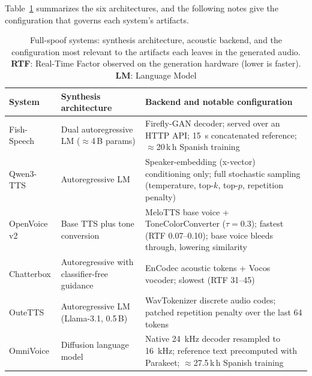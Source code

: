 \documentclass[11pt]{article}
\begin{document}
Table~\ref{tab:systems} summarizes the six architectures, and the
following notes give the configuration that governs each system's
artifacts.

\begin{table}[t]
\centering
\caption{Full-spoof systems: synthesis architecture, acoustic backend,
and the configuration most relevant to the artifacts each leaves in the
generated audio. \textbf{RTF}: Real-Time Factor observed on the generation
hardware (lower is faster). \textbf{LM}: Language Model}
\label{tab:systems}
\small
\begin{tabular}{p{2.1cm}p{3.0cm}p{4.6cm}}
\toprule
\textbf{System} & \textbf{Synthesis architecture} & \textbf{Backend and notable configuration} \\
\midrule
Fish-Speech & Dual autoregressive LM ($\approx$4\,B params) & Firefly-GAN decoder; served over an HTTP API; \SI{15}{\second} concatenated reference; $\approx$20\,k\,h Spanish training \\
Qwen3-TTS & Autoregressive LM & Speaker-embedding (x-vector) conditioning only; full stochastic sampling (temperature, top-$k$, top-$p$, repetition penalty) \\
OpenVoice v2 & Base TTS plus tone conversion & MeloTTS base voice + ToneColorConverter ($\tau=0.3$); fastest (RTF 0.07--0.10); base voice bleeds through, lowering similarity \\
Chatterbox & Autoregressive with classifier-free guidance & EnCodec acoustic tokens + Vocos vocoder; slowest (RTF 31--45) \\
OuteTTS & Autoregressive LM (Llama-3.1, 0.5\,B) & WavTokenizer discrete audio codes; patched repetition penalty over the last 64 tokens \\
OmniVoice & Diffusion language model & Native \SI{24}{\kilo\hertz} decoder resampled to \SI{16}{\kilo\hertz}; reference text precomputed with Parakeet; $\approx$27.5\,k\,h Spanish training \\
\bottomrule
\end{tabular}
\end{table}
\end{document}
